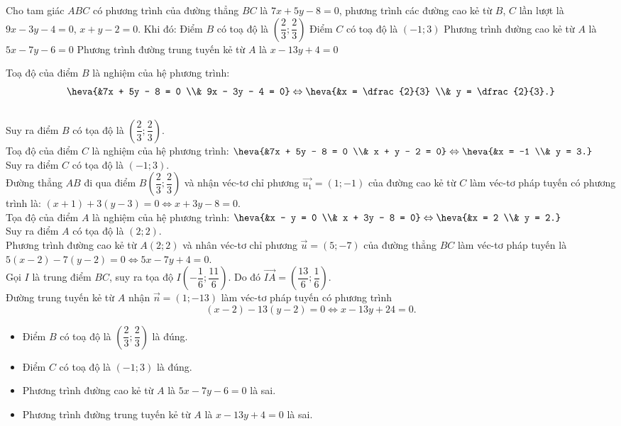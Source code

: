\begin{ex}%
	Cho tam giác $ABC$ có phương trình của đường thẳng $BC$ là $7x + 5y - 8 = 0$, phương trình các đường cao kẻ từ $B$, $C$ lần lượt là $9x - 3y - 4 = 0$, $x + y - 2 = 0$. Khi đó:
	\choiceTF
	{\True Điểm $B$ có toạ độ là $\left(\dfrac{2}{3} ; \dfrac{2}{3}\right)$}
	{\True Điểm $C$ có toạ độ là $(-1 ; 3)$}
	{Phương trình đường cao kẻ từ $A$ là $5x - 7y - 6 = 0$}
	{Phương trình đường trung tuyến kẻ từ $A$ là $x - 13y + 4 = 0$}
	\loigiai
	{Toạ độ của điểm $B$ là nghiệm của hệ phương trình:\\
		$$\heva{&7x + 5y - 8 = 0 \\& 9x - 3y - 4 = 0}\Leftrightarrow \heva{&x = \dfrac{2}{3} \\& y = \dfrac{2}{3}.}$$\\
		Suy ra điểm $B$ có tọa độ là $\left(\dfrac{2}{3} ; \dfrac{2}{3}\right)$.\\
		Toạ độ của điểm $C$ là nghiệm của hệ phương trình: $\heva{&7x + 5y - 8 = 0 \\& x + y - 2 = 0}  \Leftrightarrow \heva{&x = -1 \\& y = 3.}$\\
		Suy ra điểm $C$ có tọa độ là $(-1 ; 3)$.\\
		Đường thẳng $AB$ đi qua điểm $B\left(\dfrac{2}{3} ; \dfrac{2}{3}\right)$ và nhận véc-tơ chỉ phương $\vec{u_1} = (1 ;-1)$ của đường cao kẻ từ $C$ làm véc-tơ pháp tuyến có phương trình là: $(x + 1) + 3(y - 3) = 0 \Leftrightarrow x + 3y - 8 = 0$.\\
		Tọa độ của điểm $A$ là nghiệm của hệ phương trình: $\heva{&x - y = 0 \\& x + 3y - 8 = 0} \Leftrightarrow \heva{&x = 2 \\& y = 2.}$\\
		Suy ra điểm $A$ có tọa độ là $(2 ; 2)$.\\
		Phương trình đường cao kẻ từ $A(2 ; 2)$ và nhân véc-tơ chỉ phương $\vec{u} =(5 ;-7)$ của đường thẳng $BC$ làm véc-tơ pháp tuyến là $5(x - 2) - 7(y - 2) = 0 \Leftrightarrow 5x - 7y + 4 = 0$.\\
		Gọi $I$ là trung điểm $BC$, suy ra tọa độ $I \left(-\dfrac{1}{6}; \dfrac{11}{6}\right)$. Do đó $\vec{IA} = \left(\dfrac{13}{6}; \dfrac{1}{6}\right)$.\\
		Đường trung tuyến kẻ từ $A$ nhận $\vec{n} = (1; -13)$ làm véc-tơ pháp tuyến có phương trình 
		$$(x - 2) - 13(y - 2) = 0 \Leftrightarrow x - 13 y + 24 = 0.$$
		\begin{itemize}
			\item Điểm $B$ có toạ độ là $\left(\dfrac{2}{3} ; \dfrac{2}{3}\right)$ là đúng.
			\item Điểm $C$ có toạ độ là $(-1 ; 3)$ là đúng.
			\item Phương trình đường cao kẻ từ $A$ là $5x - 7y - 6 = 0$ là sai.
			\item Phương trình đường trung tuyến kẻ từ $A$ là $x - 13y + 4 = 0$ là sai.
		\end{itemize}
	}
\end{ex}

